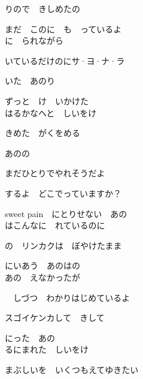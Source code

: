 \large{

りので　きしめたの

まだ　このに　も　っているよ
\\

に　られながら

いているだけのにサ·ヨ·ナ·ラ

いた　あのり

ずっと　け　いかけた
\\

はるかなへと　しいをけ

きめた　がくをめる

あのの

まだひとりでやれそうだよ

するよ　どこでっていますか？

sweet pain　にとりせない　あの
\\

はこんなに　れているのに

の　リンカクは　ぼやけたまま

にいあう　あのはの
\\

あの　えなかったが

　しづつ　わかりはじめているよ

スゴイケンカして　きして

にった　あの
\\

るにまれた　しいをけ

まぶしいを　いくつもえてゆきたい

}
